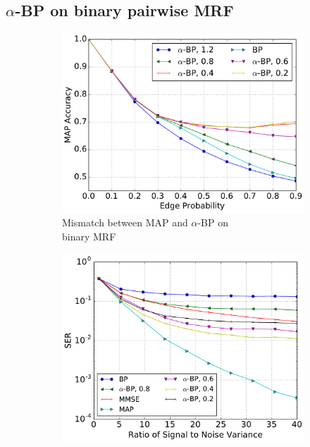 \documentclass[conference]{IEEEtran}
\begin{document}
\subsection{$\alpha$-BP on binary pairwise MRF}
\begin{figure}[!ht]
  \begin{subfigure}{.339\textwidth}
    \captionsetup[subfigure]{justification=centering}
    \centering
    \includegraphics[width=1\linewidth]{figures/MAPacc_edgeP_sum_crop.pdf}
    \vspace{-0.6cm}
    \caption{Mismatch between MAP and $\alpha$-BP on\\ binary MRF}
    \label{fig:mismatch}
  \end{subfigure}
  \begin{subfigure}{.33\textwidth}
    \includegraphics[width=1\linewidth]{figures/alpha_compare_crop.pdf}

\end{subfigure}
\end{figure}
\end{document}

